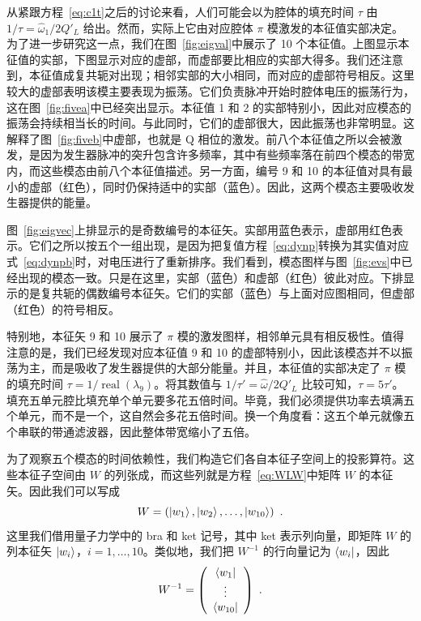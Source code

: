 \documentclass[12pt]{article}
\newcommand\real{\mathop{\mathrm{real}}}
\newcommand\ho{\hat\omega}
\begin{document}
从紧跟方程~\ref{eq:c1t}之后的讨论来看，人们可能会以为腔体的填充时间 $\tau$ 由 $1/\tau=\ho_1/2Q'_L$ 给出。然而，实际上它由对应腔体 $\pi$ 模激发的本征值实部决定。为了进一步研究这一点，我们在图~\ref{fig:eigval}中展示了 10 个本征值。上图显示本征值的实部，下图显示对应的虚部，而虚部要比相应的实部大得多。我们还注意到，本征值成复共轭对出现；相邻实部的大小相同，而对应的虚部符号相反。这里较大的虚部表明该模主要表现为振荡。它们负责脉冲开始时腔体电压的振荡行为，这在图~\ref{fig:fivea}中已经突出显示。本征值 1 和 2 的实部特别小，因此对应模态的振荡会持续相当长的时间。与此同时，它们的虚部很大，因此振荡也非常明显。这解释了图~\ref{fig:fiveb}中虚部，也就是 Q 相位的激发。前八个本征值之所以会被激发，是因为发生器脉冲的突升包含许多频率，其中有些频率落在前四个模态的带宽内，而这些模态由前八个本征值描述。另一方面，编号 9 和 10 的本征值对具有最小的虚部（红色），同时仍保持适中的实部（蓝色）。因此，这两个模态主要吸收发生器提供的能量。
\par
图~\ref{fig:eigvec}上排显示的是奇数编号的本征矢。实部用蓝色表示，虚部用红色表示。它们之所以按五个一组出现，是因为把复值方程~\ref{eq:dynp}转换为其实值对应式~\ref{eq:dynpb}时，对电压进行了重新排序。我们看到，模态图样与图~\ref{fig:evs}中已经出现的模态一致。只是在这里，实部（蓝色）和虚部（红色）彼此对应。下排显示的是复共轭的偶数编号本征矢。它们的实部（蓝色）与上面对应图相同，但虚部（红色）的符号相反。
\par
特别地，本征矢 9 和 10 展示了 $\pi$ 模的激发图样，相邻单元具有相反极性。值得注意的是，我们已经发现对应本征值 9 和 10 的虚部特别小，因此该模态并不以振荡为主，而是吸收了发生器提供的大部分能量。并且，本征值的实部决定了 $\pi$ 模的填充时间 $\tau=1/\real(\lambda_9)$。将其数值与 $1/\tau'= \ho/2Q'_L$ 比较可知，$\tau=5\tau'$。填充五单元腔比填充单个单元要多花五倍时间。毕竟，我们必须提供功率去填满五个单元，而不是一个，这自然会多花五倍时间。换一个角度看：这五个单元就像五个串联的带通滤波器，因此整体带宽缩小了五倍。
\par
为了观察五个模态的时间依赖性，我们构造它们各自本征子空间上的投影算符。这些本征子空间由 $W$ 的列张成，而这些列就是方程~\ref{eq:WLW}中矩阵 $W$ 的本征矢。因此我们可以写成
\begin{equation}
W=\left(\ket{w_1},\ket{w_2},\dots,\ket{w_{10}}\right)\ .
\end{equation}
这里我们借用量子力学中的 bra 和 ket 记号，其中 ket 表示列向量，即矩阵 $W$ 的列本征矢 $\ket{w_i}$，$i=1,\dots,10$。类似地，我们把 $W^{-1}$ 的行向量记为 $\bra{w_i}$，因此
\begin{equation}
W^{-1}=\left(\begin{array}{c}\bra{w_1}\\ \vdots \\ \bra{w_{10}}\end{array}\right)\ .
\end{equation}
\end{document}
